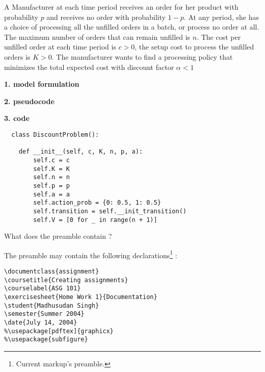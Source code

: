 \documentclass{assignment}
\date{Dec 30, 2021}
\begin{document}

\begin{problemlist}
\pbitem 
A Manufacturer at each time period receives an order for 
her product with probability $p$ and receives no order with 
probability $1-p$.
At any period, she has a choice of processing all the unfilled orders 
in a batch, or process no order at all. The maximum number of orders that 
can remain unfilled is $n$.
The cost per unfilled order at each time period is $c > 0$, 
the setup cost to process the unfilled orders is $K > 0$.
The manufacturer wants to find a processing policy that minimizes 
the total expected cost with discount factor $\alpha<1$

\begin{problem}
\begin{answer}
  \vspace{-1cm}
\begin{flushleft}
  \large\textbf{1. model formulation}
\end{flushleft}


\begin{flushleft}
  \large\textbf{2. pseudocode}
\end{flushleft}

\begin{flushleft}
  \large\textbf{3. code}
\end{flushleft}
\begin{lstlisting}
  class DiscountProblem():

    def __init__(self, c, K, n, p, a):
        self.c = c
        self.K = K
        self.n = n
        self.p = p
        self.a = a
        self.action_prob = {0: 0.5, 1: 0.5}
        self.transition = self.__init_transition()
        self.V = [0 for _ in range(n + 1)]

\end{lstlisting}

\end{answer}
\end{problem}

\pbitem What does the preamble contain ?

The preamble may contain the following declarations\footnote{Current markup's preamble.} :

\begin{verbatim}
\documentclass{assignment}
\coursetitle{Creating assignments}
\courselabel{ASG 101}
\exercisesheet{Home Work 1}{Documentation}
\student{Madhusudan Singh}
\semester{Summer 2004}
\date{July 14, 2004}
%\usepackage[pdftex]{graphicx}
%\usepackage{subfigure}
\end{verbatim}



\end{problemlist}
\end{document}
